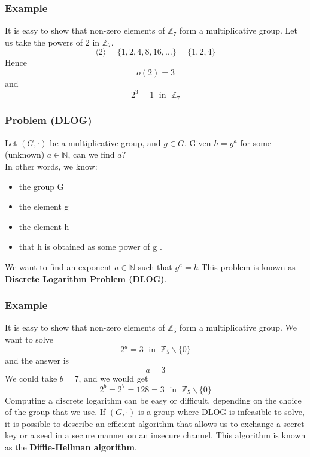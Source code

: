\documentclass[a4paper, 10pt, titlepage]{article}
\begin{document}
\subsubsection*{Example}
It is easy to show that non-zero elements of $\mathbb{Z}_7$ form a multiplicative group.
Let us take the powers of 2 in $\mathbb{Z}_7$.
$$\langle 2 \rangle = \{1, 2, 4, 8, 16, \dots \} = \{1, 2, 4\}$$
Hence
$$o(2) = 3$$
and
$$2^3 = 1 \;\text{ in } \; \mathbb{Z}_7$$

\subsubsection*{Problem (DLOG)}
Let $(G, \cdot)$ be a multiplicative group, and $g \in G$.
Given $h = g^a$ for some (unknown) $a \in \mathbb{N}$, can we find $a$? \\
In other words, we know:
\begin{itemize}
\item the group G
\item the element g
\item the element h
\item that h is obtained as some power of g .
\end{itemize}
We want to find an exponent $a \in \mathbb{N}$ such that $g^a = h$
This problem is known as \textbf{Discrete Logarithm Problem (DLOG)}.

\subsubsection*{Example}
It is easy to show that non-zero elements of $\mathbb{Z}_5$ form a multiplicative group. 
We want to solve
$$2^a = 3 \; \text{ in }\; \mathbb{Z}_5 \backslash \{0\}$$
and the answer is
$$a =3$$
We could take $b = 7$, and we would get
$$2^b = 2^7 = 128 = 3 \;\text{ in }\; \mathbb{Z}_5 \backslash \{0\}$$
Computing a discrete logarithm can be easy or difficult, depending on the choice of the group that we use.
If $(G , \cdot)$ is a group where DLOG is infeasible to solve, it is possible to describe an efficient algorithm that allows us to exchange a secret key or a seed in a secure manner on an insecure channel. This algorithm is known as the \textbf{Diffie-Hellman algorithm}.
\end{document}
